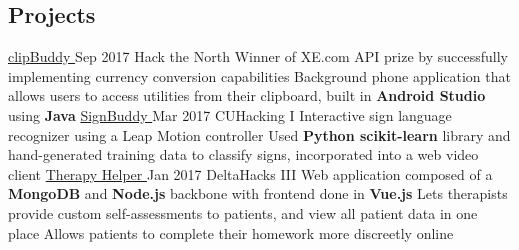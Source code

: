 \documentclass[]{aanguyen_res}
\begin{document}
\begin{main}
		\section{Projects}
			\vspace{0.1cm}%
			\mainentry%
				{\href{https://github.com/kumailn/clipBuddy}{clipBuddy {\faGithub}}}%
				{Sep 2017}%
				{Hack the North}%
				{}%
				{\faCaretRight Winner of XE.com API prize by successfully implementing currency conversion capabilities
				\faCaretRight Background phone application that allows users to access utilities from their clipboard, built in \textbf{Android Studio} using \textbf{Java}}
			\vspace{0.1cm}%
			\mainentry%
				{\href{https://github.com/aanguyen/SignBuddy}{SignBuddy {\faGithub}}}%
				{Mar 2017}%
				{CUHacking I}%
				{}%
				{\faCaretRight Interactive sign language recognizer using a Leap Motion controller 
				\faCaretRight Used \textbf{Python scikit-learn} library and hand-generated training data to classify signs, incorporated into a web video client}
			\vspace{0.1cm}%
			\mainentry%
				{\href{https://github.com/dtong1113/TherapyHelper}{Therapy Helper {\faGithub}}}%
				{Jan 2017}%
				{DeltaHacks III}%
				{}%
				{\faCaretRight Web application composed of a \textbf{MongoDB} and \textbf{Node.js} backbone with frontend done in \textbf{Vue.js}
				\faCaretRight Lets therapists provide custom self-assessments to patients, and view all patient data in one place
				\faCaretRight Allows patients to complete their homework more discreetly online}

\end{main}
\end{document}
